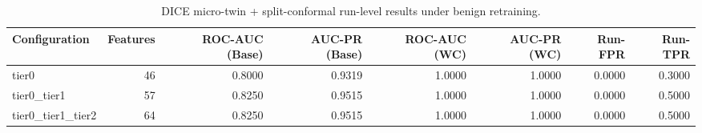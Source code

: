 \begin{table}[t]
\centering
\caption{DICE micro-twin + split-conformal run-level results under benign retraining.}
\label{tab:dice_full_overall}
\footnotesize
\begin{tabular}{lrrrrrrr}
\toprule
Configuration & Features & ROC-AUC (Base) & AUC-PR (Base) & ROC-AUC (WC) & AUC-PR (WC) & Run-FPR & Run-TPR \\
\midrule
tier0 & 46 & 0.8000 & 0.9319 & 1.0000 & 1.0000 & 0.0000 & 0.3000 \\
tier0_tier1 & 57 & 0.8250 & 0.9515 & 1.0000 & 1.0000 & 0.0000 & 0.5000 \\
tier0_tier1_tier2 & 64 & 0.8250 & 0.9515 & 1.0000 & 1.0000 & 0.0000 & 0.5000 \\
\bottomrule
\end{tabular}

\end{table}
